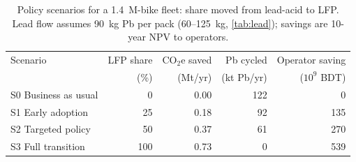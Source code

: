 \begin{table}[t]
\centering\small
\caption{Policy scenarios for a 1.4~M-bike fleet: share moved from lead-acid to LFP. Lead flow assumes 90~kg Pb per pack (60--125~kg, \cref{tab:lead}); savings are 10-year NPV to operators.}
\label{tab:policy}
\begin{tabular}{lrrrr}
\toprule
Scenario & LFP share & CO$_2$e saved & Pb cycled & Operator saving \\
 & (\%) & (Mt/yr) & (kt Pb/yr) & ($10^9$ BDT) \\
\midrule
S0 Business as usual & 0 & 0.00 & 122 & 0 \\
S1 Early adoption & 25 & 0.18 & 92 & 135 \\
S2 Targeted policy & 50 & 0.37 & 61 & 270 \\
S3 Full transition & 100 & 0.73 & 0 & 539 \\
\bottomrule
\end{tabular}
\end{table}
